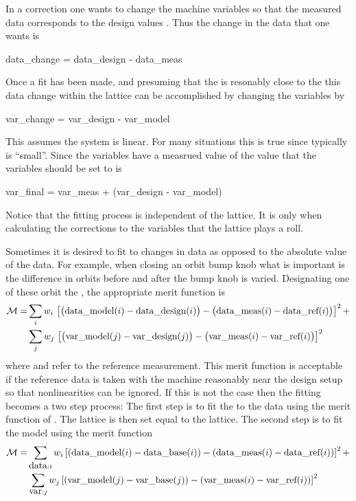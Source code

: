 In a correction one wants to change the machine variables so that the
measured data corresponds to the design values . Thus
the change in the data that one wants is
\begin{example}
  data_change = data_design - data_meas
\end{example}
Once a fit has been made, and presuming that the  is
resonably close to the  this data change within the
 lattice can be accomplished by changing the variables by
\begin{example}
  var_change = var_design - var_model
\end{example}
This assumes the system is linear. For many situations this is true
since typically  is ``small''. Since the variables have
a measrued value of  the value that the variables should
be set to is
\begin{example}
  var_final = var_meas + (var_design - var_model)
\end{example}
Notice that the fitting process is independent of the 
lattice. It is only when calculating the corrections to the
variables that the  lattice plays a roll. 

Sometimes it is desired to fit to changes in data as opposed to the
absolute value of the data. For example, when closing an orbit bump
knob what is important is the difference in orbits before and after
the bump knob is varied. Designating one of these orbit the
, the appropriate merit function is
\begin{alignat}{1}
  {\cal M} = &\sum_{i} w_i \,
    \left[ \bigl( {\mbox{data}}\_{\mbox{model}}(i) - {\mbox{data}}\_{\mbox{design}}(i) \bigr) - 
      \bigl( {\mbox{data}}\_{\mbox{meas}}(i) - {\mbox{data}}\_{\mbox{ref}}(i) \bigr) \right]^2 + \nonumber \\
  &\sum_{j} w_j \,
    \left[ \bigl( {\mbox{var}}\_{\mbox{model}}(j) - {\mbox{var}}\_{\mbox{design}}(j) \bigr) -
     \bigl( {\mbox{var}}\_{\mbox{meas}}(i) - {\mbox{var}}\_{\mbox{ref}}(i) \bigr) \right]^2 
  \label{m2}
\end{alignat}
where  and  refer to the reference
measurement.  This merit function is acceptable if the reference data
is taken with the machine reasonably near the design setup so that
nonlinearities can be ignored. If this is not the case then the
fitting becomes a two step process: The first step is to fit the
 to the  data using the merit function of
. The  lattice is then set equal to the 
lattice. The second step is to fit the model using the merit function
\begin{alignat}{1}
  {\cal M} = &\sum_{{\mbox{data}}: i} w_i 
    \left[ ({\mbox{data}}\_{\mbox{model}}(i) - {\mbox{data}}\_{\mbox{base}}(i)) - 
      ({\mbox{data}}\_{\mbox{meas}}(i) - {\mbox{data}}\_{\mbox{ref}}(i)) \right]^2 + \nonumber \\
  &\sum_{{\mbox{var}}: j} w_j 
    \left[ ({\mbox{var}}\_{\mbox{model}}(j) - {\mbox{var}}\_{\mbox{base}}(j)) -
     ({\mbox{var}}\_{\mbox{meas}}(i) - {\mbox{var}}\_{\mbox{ref}}(i)) \right]^2 
  \label{m3}
\end{alignat}

